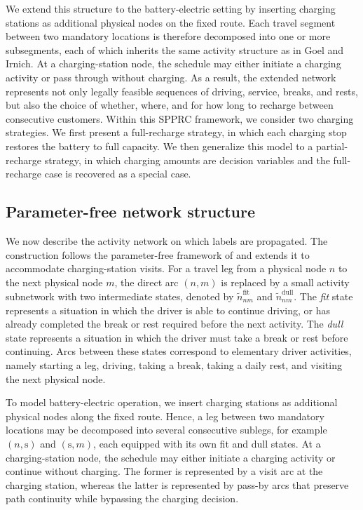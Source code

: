 \documentclass[3p,11pt,authoryear]{elsarticle}  %
\begin{document}
We extend this structure to the battery-electric setting by inserting charging stations as additional physical nodes on the fixed route. Each travel segment between two mandatory locations is therefore decomposed into one or more subsegments, each of which inherits the same activity structure as in Goel and Irnich. At a charging-station node, the schedule may either initiate a charging activity or pass through without charging. As a result, the extended network represents not only legally feasible sequences of driving, service, breaks, and rests, but also the choice of whether, where, and for how long to recharge between consecutive customers. Within this SPPRC framework, we consider two charging strategies. We first present a full-recharge strategy, in which each charging stop restores the battery to full capacity. We then generalize this model to a partial-recharge strategy, in which charging amounts are decision variables and the full-recharge case is recovered as a special case.


\subsection{Parameter-free network structure}
We now describe the activity network on which labels are propagated. The construction follows the parameter-free framework of \citet{goel2017exact} and extends it to accommodate charging-station visits. For a travel leg from a physical node \(n\) to the next physical node \(m\), the direct arc \((n,m)\) is replaced by a small activity subnetwork with two intermediate states, denoted by \(\tilde n_{nm}^{\mathrm{fit}}\) and \(\tilde n_{nm}^{\mathrm{dull}}\). The \emph{fit} state represents a situation in which the driver is able to continue driving, or has already completed the break or rest required before the next activity. The \emph{dull} state represents a situation in which the driver must take a break or rest before continuing. Arcs between these states correspond to elementary driver activities, namely starting a leg, driving, taking a break, taking a daily rest, and visiting the next physical node.

To model battery-electric operation, we insert charging stations as additional physical nodes along the fixed route. Hence, a leg between two mandatory locations may be decomposed into several consecutive sublegs, for example \((n,\mathrm{s})\) and \((\mathrm{s},m)\), each equipped with its own fit and dull states. At a charging-station node, the schedule may either initiate a charging activity or continue without charging. The former is represented by a visit arc at the charging station, whereas the latter is represented by pass-by arcs that preserve path continuity while bypassing the charging decision.
\end{document}

